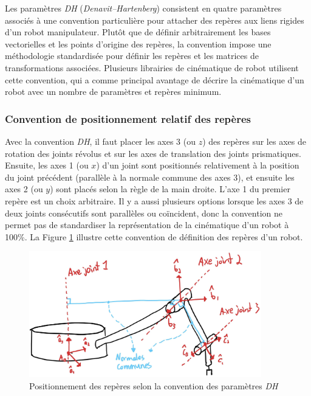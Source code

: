 Les paramètres \textit{DH} (\textit{Denavit–Hartenberg}) consistent en quatre paramètres associés à une convention particulière pour attacher des repères aux liens rigides d'un robot manipulateur. Plutôt que de définir arbitrairement les bases vectorielles et les points d'origine des repères, la convention impose une méthodologie standardisée pour définir les repères et les matrices de transformations associées. Plusieurs librairies de cinématique de robot utilisent cette convention, qui a comme principal avantage de décrire la cinématique d'un robot avec un nombre de paramètres et repères minimum.

\subsubsection{Convention de positionnement relatif des repères }
Avec la convention \textit{DH}, il faut placer les axes 3 (ou $z$) des repères sur les axes de rotation des joints révolus et sur les axes de translation des joints prismatiques. Ensuite, les axes 1 (ou $x$) d'un joint sont positionnés relativement à la position du joint précédent (parallèle à la normale commune des axes 3), et ensuite les axes 2 (ou $y$) sont placés selon la règle de la main droite. L'axe 1 du premier repère est un choix arbitraire. Il y a aussi plusieurs options lorsque les axes 3 de deux joints consécutifs sont parallèles ou coïncident, donc la convention ne permet pas de standardiser la représentation de la cinématique d'un robot à 100\%. La Figure \ref{fig:dh1} illustre cette convention de définition des repères d'un robot.
\begin{figure}[H]
	\centering
	\includegraphics[width=0.90\textwidth]{fig/dh1.jpg}
	\caption{Positionnement des repères selon la convention des paramètres \textit{DH}}
	\label{fig:dh1}
\end{figure}


